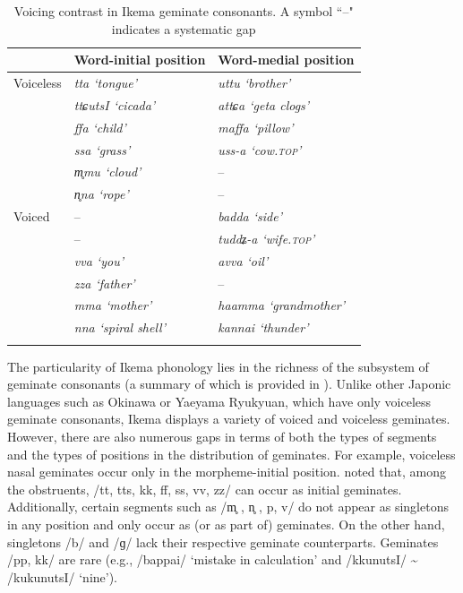 \documentclass[output=paper]{langscibook}
\begin{document}
\begin{table}[b]
\begin{tabularx}{.8\textwidth}{XXl}
\lsptoprule
 & Word-initial position & Word-medial position\\
 \midrule
Voiceless & \it{tta} ‘tongue’    & \it{uttu} ‘brother’                         \\
                   & \it{ttɕutsI} ‘cicada’&                  \it{attɕa} ‘geta clogs’    \\
                   & \it{ffa} ‘child’     &                  \it{maffa} ‘pillow’        \\
                   & \it{ssa} ‘grass’     &                  \it{uss-a} ‘cow.\textsc{top}’       \\
                   & \it{m̥mu} ‘cloud’    &                  --                    \\
                   & \it{n̥na} ‘rope’     &                  --\\
\tablevspace
Voiced & --                   & \it{badda} ‘side’           \\
                & --                   & \it{tuddʑ-a} ‘wife.\textsc{top}’     \\
                & \it{vva} ‘you’            & \it{avva} ‘oil’             \\
                & \it{zza} ‘father’         &     --                 \\
                & \it{mma} ‘mother’         & \it{haamma} ‘grandmother’   \\
                & \it{nna} ‘spiral shell’   & \it{kannai} ‘thunder’\\
\lspbottomrule
\end{tabularx}
\caption{Voicing contrast in Ikema geminate consonants. A symbol “--" indicates a systematic gap}
\label{tab:shinohara:4}
\end{table}


The particularity of Ikema phonology lies in the richness of the subsystem of geminate consonants (a summary of which is provided in ). Unlike other Japonic languages such as Okinawa or Yaeyama Ryukyuan, which have only voiceless geminate consonants, Ikema displays a variety of voiced and voiceless geminates. However, there are also numerous gaps in terms of both the types of segments and the types of positions in the distribution of geminates. For example, voiceless nasal geminates occur only in the morpheme-initial position. \citet{Hayashi2010} noted that, among the obstruents, /tt, tts, kk, ff, ss, vv, zz/ can occur as initial geminates. Additionally, certain segments such as /m̥ , n̥ , p, v/ do not appear as singletons in any position and only occur as (or as part of) geminates. On the other hand, singletons /b/ and /ɡ/ lack their respective geminate counterparts. Geminates /pp, kk/ are rare (e.g., /bappai/ ‘mistake in calculation’ and /kkunutsI/ {\textasciitilde} /kukunutsI/ ‘nine’).
\end{document}
